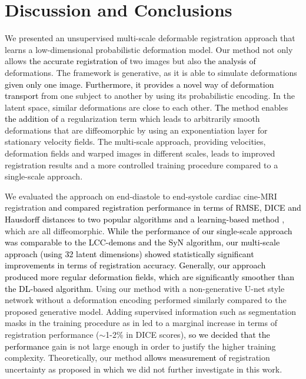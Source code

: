 \documentclass[journal]{IEEEtran}
\newcommand{\update}[1]{\textcolor{black}{#1}}
\begin{document}
\section{Discussion and Conclusions}
We presented an unsupervised multi-scale deformable registration approach that learns a low-dimensional probabilistic deformation model. Our method not only allows \update{the accurate registration of} two images but also \update{the analysis of} deformations. The framework is generative, as it is able to simulate deformations \update{given only one image. Furthermore, it provides a novel way of deformation transport} from one subject to another by using its probabilistic encoding. In the latent space, similar deformations are close to each other. \update{The} method enables \update{the addition of} a regularization term which leads to arbitrarily smooth deformations that are diffeomorphic by using an exponentiation layer for stationary velocity fields. The multi-scale approach, providing velocities, deformation fields and warped images in different scales, leads to improved registration results and a more controlled training procedure compared to a single-scale approach. 

We evaluated the approach on end-diastole to end-systole cardiac cine-MRI registration \update{and compared registration performance in terms of RMSE, DICE and Hausdorff distances to two popular algorithms  \cite{lorenzi2013lcc,avants2008symmetric} and a learning-based method \cite{dalca2018unsupervised}}, which are all diffeomorphic. \update{While the performance of our single-scale approach was comparable to the LCC-demons and the SyN algorithm, our multi-scale approach (using 32 latent dimensions) showed statistically significant improvements in terms of registration accuracy. Generally, our approach produced more regular deformation fields, which are significantly smoother than the DL-based algorithm.} Using our method with a non-generative U-net style network \cite{ronneberger2015u} without a deformation encoding performed similarly compared to the proposed generative model. Adding supervised information such as segmentation masks in the training procedure as in \cite{hu2018weakly,fan2018birnet} led to a marginal increase in terms of registration performance ($\sim$1-2\% in DICE scores), \update{so we decided that the performance} gain is not large enough in order to justify the higher training complexity. Theoretically, our method \update{allows measurement of} registration uncertainty as proposed in \cite{dalca2018unsupervised} which we did not further investigate in this work. 
\end{document}
